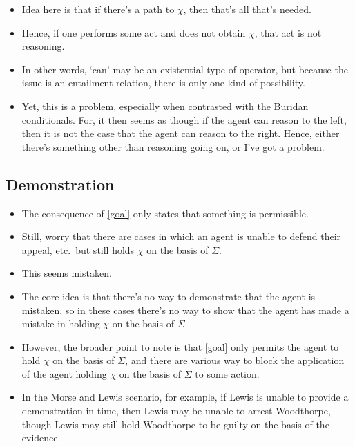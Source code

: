 \documentclass[10pt]{article}
\begin{document}
\begin{itemize}
\item Idea here is that if there's a path to \(\chi\), then that's all that's needed.
\item Hence, if one performs some act and does not obtain \(\chi\), that act is not reasoning.
\end{itemize}

\begin{itemize}
\item In other words, `can' may be an existential type of operator, but because the issue is an entailment relation, there is only one kind of possibility.
\item Yet, this is a problem, especially when contrasted with the Buridan conditionals.
  For, it then seems as though if the agent can reason to the left, then it is not the case that the agent can reason to the right.
  Hence, either there's something other than reasoning going on, or I've got a problem.
\end{itemize}

\subsection{Demonstration}
\label{sec:demonstration}

\begin{itemize}
\item The consequence of \ref{goal} only states that something is permissible.
\item Still, worry that there are cases in which an agent is unable to defend their appeal, etc.\ but still holds \(\chi\) on the basis of \(\Sigma\).
\item This seems mistaken.
\item The core idea is that there's no way to demonstrate that the agent is mistaken, so in these cases there's no way to show that the agent has made a mistake in holding \(\chi\) on the basis of \(\Sigma\).
\item However, the broader point to note is that \ref{goal} only permits the agent to hold \(\chi\) on the basis of \(\Sigma\), and there are various way to block the application of the agent holding \(\chi\) on the basis of \(\Sigma\) to some action.
\item In the Morse and Lewis scenario, for example, if Lewis is unable to provide a demonstration in time, then Lewis may be unable to arrest Woodthorpe, though Lewis may still hold Woodthorpe to be guilty on the basis of the evidence.
\end{itemize}
\end{document}
